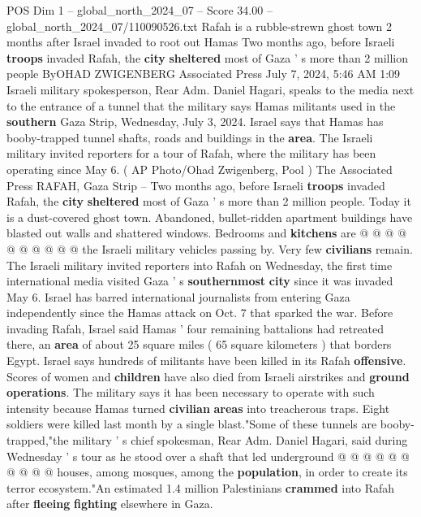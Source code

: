 \begin{textsample}{POS Dim 1 – global\_north\_2024\_07 – Score 34.00 – global\_north\_2024\_07/110090526.txt}  \label{ex:f1_pos_385}
Rafah is a rubble-strewn ghost town 2 months after Israel invaded to root out Hamas Two months ago, before Israeli \textbf{troops} invaded Rafah, the \textbf{city} \textbf{sheltered} most of Gaza ' s more than 2 million people ByOHAD ZWIGENBERG Associated Press July 7, 2024, 5:46 AM 1:09 Israeli military spokesperson, Rear Adm.
Daniel Hagari, speaks to the media next to the entrance of a tunnel that the military says Hamas militants used in the \textbf{southern} Gaza Strip, Wednesday, July 3, 2024.
Israel says that Hamas has booby-trapped tunnel shafts, roads and buildings in the \textbf{area}.
The Israeli military invited reporters for a tour of Rafah, where the military has been operating since May 6. ( AP Photo/Ohad Zwigenberg, Pool ) The Associated Press RAFAH, Gaza Strip -- Two months ago, before Israeli \textbf{troops} invaded Rafah, the \textbf{city} \textbf{sheltered} most of Gaza ' s more than 2 million people.
Today it is a dust-covered ghost town.
Abandoned, bullet-ridden apartment buildings have blasted out walls and shattered windows.
Bedrooms and \textbf{kitchens} are @ @ @ @ @ @ @ @ @ @ the Israeli military vehicles passing by.
Very few \textbf{civilians} remain.
The Israeli military invited reporters into Rafah on Wednesday, the first time international media visited Gaza ' s \textbf{southernmost} \textbf{city} since it was invaded May 6.
Israel has barred international journalists from entering Gaza independently since the Hamas attack on Oct. 7 that sparked the war.
Before invading Rafah, Israel said Hamas ' four remaining battalions had retreated there, an \textbf{area} of about 25 square miles ( 65 square kilometers ) that borders Egypt.
Israel says hundreds of militants have been killed in its Rafah \textbf{offensive}.
Scores of women and \textbf{children} have also died from Israeli airstrikes and \textbf{ground} \textbf{operations}.
The military says it has been necessary to operate with such intensity because Hamas turned \textbf{civilian} \textbf{areas} into treacherous traps.
Eight soldiers were killed last month by a single blast."Some of these tunnels are booby-trapped,"the military ' s chief spokesman, Rear Adm.
Daniel Hagari, said during Wednesday ' s tour as he stood over a shaft that led underground @ @ @ @ @ @ @ @ @ @ houses, among mosques, among the \textbf{population}, in order to create its terror ecosystem."An estimated 1.4 million Palestinians \textbf{crammed} into Rafah after \textbf{fleeing} \textbf{fighting} elsewhere in Gaza.

\end{textsample}
